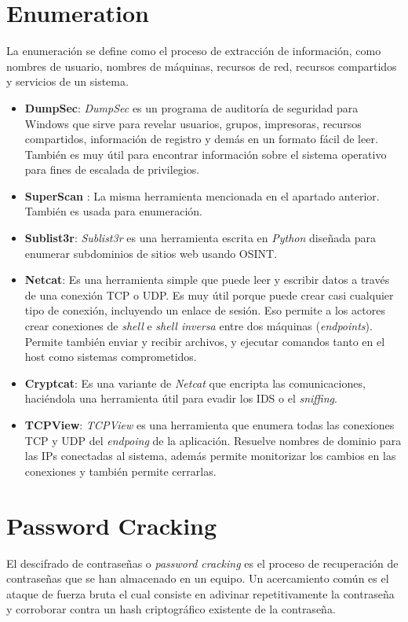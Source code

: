\documentclass[bibliography=totocnumbered]{scrartcl}
\begin{document}
\newpage
\section{Enumeration}
La enumeración se define como el proceso de extracción de información, como nombres de usuario, nombres de máquinas, recursos de red, recursos compartidos y servicios de un sistema.
\begin{itemize}
    \item \textbf{DumpSec}\parencite{dumpsec}: \textit{DumpSec} es un programa de auditoría de seguridad para Windows que sirve para revelar usuarios, grupos, impresoras, recursos compartidos, información de registro y demás en un formato fácil de leer. También es muy útil para encontrar información sobre el sistema operativo  para fines de escalada de privilegios.
    \item \textbf{SuperScan} \parencite{superscan}: La misma herramienta mencionada en el apartado anterior. También es usada para enumeración.
    \item \textbf{Sublist3r}\parencite{sublist3r}: \textit{Sublist3r} es una herramienta escrita en \textit{Python} diseñada para enumerar subdominios de sitios web usando OSINT\parencite{osint}.
    \item \textbf{Netcat}\parencite{netcat}: Es una herramienta simple que puede leer y escribir datos a través de una conexión TCP o UDP. Es muy útil porque puede crear casi cualquier tipo de conexión, incluyendo un enlace de sesión. Eso permite a los actores crear conexiones de \textit{shell} e \textit{shell inversa} entre dos máquinas (\textit{endpoints}). Permite también enviar y recibir archivos, y ejecutar comandos tanto en el host como sistemas comprometidos.
    \item \textbf{Cryptcat}\parencite{cryptcat}: Es una variante de \textit{Netcat}\parencite{netcat} que encripta las comunicaciones, haciéndola una herramienta útil para evadir los IDS o el \textit{sniffing}.
    \item \textbf{TCPView}\parencite{tcpview}: \textit{TCPView} es una herramienta que enumera todas las conexiones TCP y UDP del \textit{endpoing} de la aplicación. Resuelve nombres de dominio para las IPs conectadas al sistema, además permite monitorizar los cambios en las conexiones y también permite cerrarlas.
\end{itemize}

\newpage
\section{Password Cracking}
El descifrado de contraseñas o \textit{password cracking} es el proceso de recuperación de contraseñas que se han almacenado en un equipo. Un acercamiento común es el ataque de fuerza bruta el cual consiste en adivinar repetitivamente la contraseña y corroborar contra un hash criptográfico existente de la contraseña.\\
\end{document}
